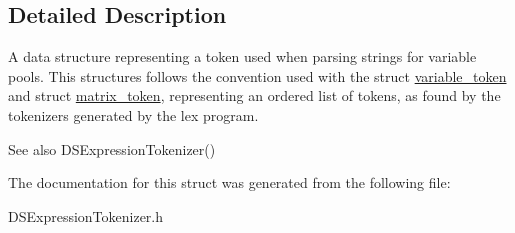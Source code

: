\subsection{Detailed Description}
A data structure representing a token used when parsing strings for variable pools. This structures follows the convention used with the struct \hyperlink{structvariable__token}{variable\_\-token} and struct \hyperlink{structmatrix__token}{matrix\_\-token}, representing an ordered list of tokens, as found by the tokenizers generated by the lex program.

\begin{DoxySeeAlso}{See also}
DSExpressionTokenizer() 
\end{DoxySeeAlso}


The documentation for this struct was generated from the following file:\begin{DoxyCompactItemize}
\item 
DSExpressionTokenizer.h\end{DoxyCompactItemize}
